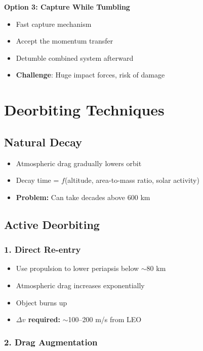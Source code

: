 \documentclass[11pt,a4paper]{article}
\begin{document}
\textbf{Option 3: Capture While Tumbling}
\begin{itemize}[leftmargin=*]
    \item Fast capture mechanism
    \item Accept the momentum transfer
    \item Detumble combined system afterward
    \item \textbf{Challenge}: Huge impact forces, risk of damage
\end{itemize}

\section{Deorbiting Techniques}

\subsection{Natural Decay}

\begin{itemize}[leftmargin=*]
    \item Atmospheric drag gradually lowers orbit
    \item Decay time = $f$(altitude, area-to-mass ratio, solar activity)
    \item \textbf{Problem:} Can take decades above 600 km
\end{itemize}

\subsection{Active Deorbiting}

\subsubsection{1. Direct Re-entry}
\begin{itemize}[leftmargin=*]
    \item Use propulsion to lower periapsis below $\sim$80 km
    \item Atmospheric drag increases exponentially
    \item Object burns up
    \item \textbf{$\Delta v$ required:} $\sim$100--200 m/s from LEO
\end{itemize}

\subsubsection{2. Drag Augmentation}
\end{document}

